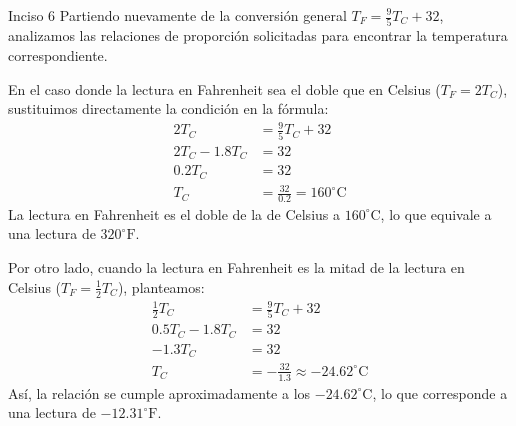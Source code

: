 \documentclass[11pt,letterpaper]{article}
\begin{document}
\begin{inciso}{Inciso 6}
Partiendo nuevamente de la conversión general $T_F = \frac{9}{5}T_C + 32$, analizamos las relaciones de proporción solicitadas para encontrar la temperatura correspondiente.

En el caso donde la lectura en Fahrenheit sea el doble que en Celsius ($T_F = 2T_C$), sustituimos directamente la condición en la fórmula:
\begin{align*}
    2T_C &= \frac{9}{5}T_C + 32 \\
    2T_C - 1.8T_C &= 32 \\
    0.2T_C &= 32 \\
    T_C &= \frac{32}{0.2} = 160^\circ\text{C}
\end{align*}
La lectura en Fahrenheit es el doble de la de Celsius a $160^\circ\text{C}$, lo que equivale a una lectura de $320^\circ\text{F}$.

Por otro lado, cuando la lectura en Fahrenheit es la mitad de la lectura en Celsius ($T_F = \frac{1}{2}T_C$), planteamos:
\begin{align*}
    \frac{1}{2}T_C &= \frac{9}{5}T_C + 32 \\
    0.5T_C - 1.8T_C &= 32 \\
    -1.3T_C &= 32 \\
    T_C &= -\frac{32}{1.3} \approx -24.62^\circ\text{C}
\end{align*}
Así, la relación se cumple aproximadamente a los $-24.62^\circ\text{C}$, lo que corresponde a una lectura de $-12.31^\circ\text{F}$.
\end{inciso}
\end{document}
